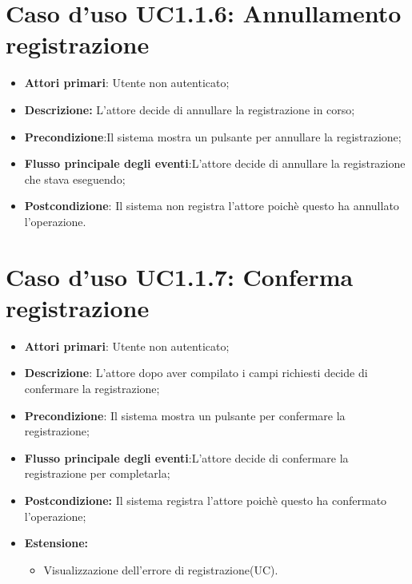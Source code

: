 		\section{Caso d'uso UC1.1.6: Annullamento registrazione}
		\begin{itemize}
			\item \textbf{Attori primari}: Utente non autenticato;
			\item \textbf{Descrizione:} L'attore decide di annullare la registrazione in corso;
			\item \textbf{Precondizione}:Il sistema mostra un pulsante per annullare la  registrazione;
			\item \textbf{Flusso principale degli eventi}:L'attore decide di annullare la registrazione che stava eseguendo;
			\item \textbf{Postcondizione}: Il sistema non registra l'attore poichè questo ha annullato l'operazione.
		\end{itemize}
		\section{Caso d'uso UC1.1.7: Conferma registrazione}
		\begin{itemize}
			\item \textbf{Attori primari}: Utente non autenticato;
			\item \textbf{Descrizione}: L'attore dopo aver compilato i campi richiesti decide di confermare  la registrazione;
			\item \textbf{Precondizione}: Il sistema mostra un pulsante per confermare la registrazione;
			\item \textbf{Flusso principale degli eventi}:L'attore decide di confermare la registrazione per completarla;
			\item \textbf{Postcondizione:} Il sistema registra l'attore poichè questo ha confermato l'operazione;
			\item \textbf{Estensione:}
			\begin{itemize}
				\item Visualizzazione dell'errore di registrazione(UC).
			\end{itemize}
		\end{itemize}
